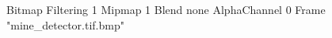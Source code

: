{Bitmap
	{Filtering 1}
	{Mipmap 1}
	{Blend none}
	{AlphaChannel 0}
	{Frame "mine_detector.tif.bmp"}
}
